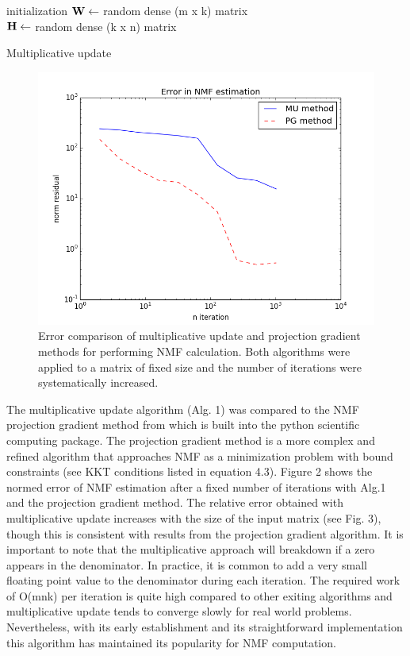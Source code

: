 \documentclass[final,leqno,onefignum,onetabnum]{siamltex1213}
\begin{document}
\begin{algorithm}[H]

 initialization\;
$\bf{W} \gets $ random dense (m x k) matrix\\
$\bf{H} \gets $ random dense (k x n) matrix\\
 \caption{Multiplicative update}
\end{algorithm}

\begin{figure}[t!]
  \centering
    \includegraphics[width=.5\linewidth]{NMF_MU_vs_PG_error}
  \caption{Error comparison of multiplicative update and projection gradient methods for performing NMF calculation. Both algorithms were applied to a matrix of fixed size and the number of iterations were systematically increased.}
\end{figure}

The multiplicative update algorithm (Alg. 1) was compared to the NMF projection gradient method from \cite{Lin} which is built into the python scientific computing package. The projection gradient method is a more complex and refined algorithm that approaches NMF as a minimization problem with bound constraints (see KKT conditions listed in equation 4.3). Figure 2 shows the normed error of NMF estimation after a fixed number of iterations with Alg.1 and the projection gradient method. The relative error obtained with multiplicative update increases with the size of the input matrix (see Fig. 3), though this is consistent with results from the projection gradient algorithm. It is important to note that the multiplicative approach will breakdown if a zero appears in the denominator. In practice, it is common to add a very small floating point value to the denominator during each iteration. The required work of O(mnk) per iteration is quite high compared to other exiting algorithms and multiplicative update tends to converge slowly for real world problems. Nevertheless, with its early establishment and its straightforward implementation this algorithm has maintained its popularity for NMF computation. 
\end{document}
